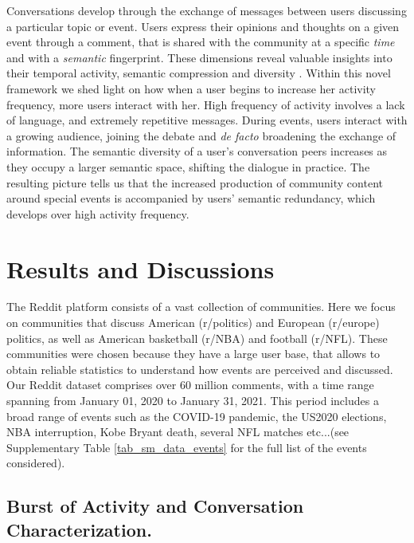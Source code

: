\documentclass[fleqn,10pt]{wlscirep}
\begin{document}
Conversations develop through the exchange of messages between users discussing a particular topic or event.
Users express their opinions and thoughts on a given event through a comment, that is shared with the community at a specific \emph{time} and with a \emph{semantic} fingerprint. 
These dimensions reveal valuable insights into their temporal activity, semantic compression and diversity \cite{gonzalez2008understanding,lombardo2022mobility}.
Within this novel framework we shed light on how when a user begins to increase her activity frequency, more users interact with her. 
High frequency of activity involves a lack of language, and extremely repetitive messages.
During events, users interact with a growing audience, joining the debate and \emph{de facto} broadening the exchange of information.
The semantic diversity of a user's conversation peers increases as they occupy a larger semantic space, shifting the dialogue in practice.
The resulting picture tells us that the increased production of community content around special events is accompanied by users' semantic redundancy, which develops over high activity frequency.
%
\section*{Results and Discussions}

The Reddit platform consists of a vast collection of communities. Here we focus on communities that discuss American (r/politics) and European (r/europe) politics, as well as American basketball (r/NBA) and football (r/NFL). These communities were chosen because they have a large user base, that allows to obtain reliable statistics to understand how events are perceived and discussed.
%
Our Reddit dataset comprises over 60 million comments, with a time range spanning from January 01, 2020 to January 31, 2021. This period includes a broad range of events such as the COVID-19 pandemic, the US2020 elections, NBA interruption, Kobe Bryant death, several NFL matches etc...(see Supplementary Table \ref{tab_sm_data_events} for the full list of the events considered).

\subsection*{Burst of Activity and Conversation Characterization.}
%
\end{document}

